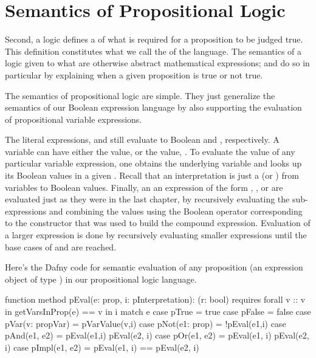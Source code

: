 \documentclass[letterpaper,10pt,english]{sphinxmanual}
\begin{document}
\section{Semantics of Propositional Logic}
\label{\detokenize{11-propositional-logic:semantics-of-propositional-logic}}
Second, a logic defines a of what is required for a proposition to be
judged true. This definition constitutes what we call the 
of the language. The semantics of a logic given  to what are
otherwise abstract mathematical expressions; and do so in particular
by explaining when a given proposition is true or not true.

The semantics of propositional logic are simple. They just generalize
the semantics of our Boolean expression language by also supporting the
evaluation of propositional variable expressions.

The literal expressions,  and  still evaluate to
Boolean  and , respectively. A variable can have either
the value,  or the value, . To evaluate the value of any
particular variable expression, one obtains the underlying variable
and looks up its Boolean values in a given .  Recall
that an interpretation is just a  (or ) from variables
to Boolean values. Finally, an an expression of the form ,
, or  are evaluated just as they were in the last
chapter, by recursively evaluating the sub-expressions and combining
the values using the Boolean operator corresponding to the constructor
that was used to build the compound expression. Evaluation of a larger
expression is done by recursively evaluating smaller expressions until
the base cases of  and  are reached.

Here’s the Dafny code for semantic evaluation of any proposition (an
expression object of type ) in our propositional logic language.

\begin{sphinxVerbatim}[commandchars=\\\{\}]
function method pEval(e: prop, i: pInterpretation): (r: bool)
     requires forall v :: v in getVarsInProp(e) ==\PYGZgt{} v in i
 \PYGZob{}
     match e
     \PYGZob{}
         case pTrue =\PYGZgt{} true
         case pFalse =\PYGZgt{} false
         case pVar(v: propVar) =\PYGZgt{} pVarValue(v,i)
         case pNot(e1: prop) =\PYGZgt{} !pEval(e1,i)
         case pAnd(e1, e2) =\PYGZgt{} pEval(e1,i) \PYGZam{}\PYGZam{} pEval(e2, i)
         case pOr(e1, e2) =\PYGZgt{}  pEval(e1, i) \textbar{}\textbar{} pEval(e2, i)
         case pImpl(e1, e2) =\PYGZgt{} pEval(e1, i) ==\PYGZgt{} pEval(e2, i)
     \PYGZcb{}
 \PYGZcb{}
\end{sphinxVerbatim}
\end{document}
